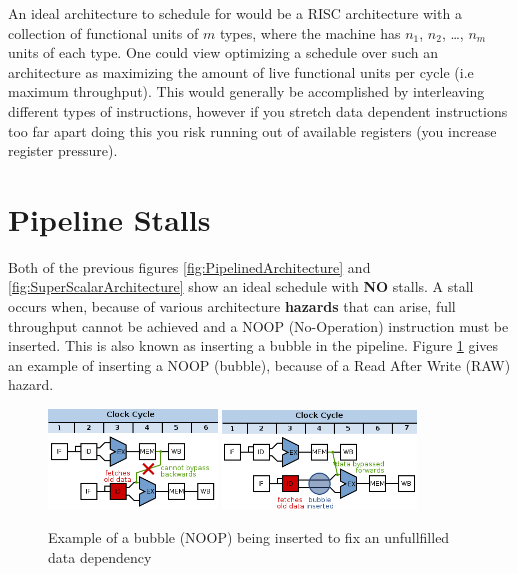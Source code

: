 \documentclass[12pt]{report}
\begin{document}
An ideal architecture to schedule for would be a RISC architecture with
a collection of functional units of \(m\) types, where the machine has \(n_1\),
\(n_2\), \ldots{}, \(n_m\) units of each type. One could view optimizing a schedule over such
an architecture as maximizing the amount of live functional units per
cycle (i.e maximum throughput). This would generally be accomplished by
interleaving different types of instructions, however if you stretch data
dependent instructions too far apart doing this you risk running out of
available registers (you increase register pressure). 

\section{Pipeline Stalls}
\label{sec:org4fa075c}
Both of the previous figures \ref{fig:PipelinedArchitecture} and
\ref{fig:SuperScalarArchitecture} show an ideal schedule with \textbf{NO} stalls. A stall
occurs when, because of various architecture \textbf{hazards} that can arise, full throughput
cannot be achieved and a NOOP (No-Operation) instruction must be inserted.
This is also known as inserting a bubble in the pipeline.
Figure \ref{fig:PipelineStall} gives an example of inserting a NOOP (bubble),
because of a Read After Write (RAW) hazard.

\begin{figure}[!h]
\begin{center}
\includegraphics[width=0.4\textwidth]{figures/bubbles.png}
\includegraphics[width=0.46\textwidth]{figures/bubbles2.png}
\end{center}
\label{fig:PipelineStall}
\caption{Example of a bubble (NOOP) being inserted to fix an unfullfilled data dependency}
\end{figure}
\end{document}
